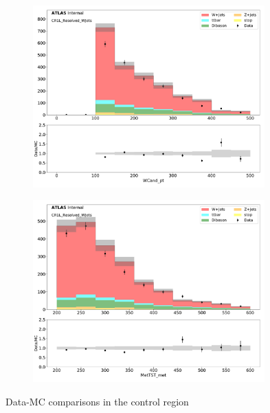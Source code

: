 \begin{figure}[htbp]
\begin{subfigure}{0.49\textwidth}
     \includegraphics[width = 0.98\textwidth]{Figures/4/datamc/CR1L_Resolved_WJets/WCand_pt.pdf}
     \caption{\Wcandpt}
     \end{subfigure}
     \begin{subfigure}{0.49\textwidth}
     \includegraphics[width = 0.98\textwidth]{Figures/4/datamc/CR1L_Resolved_WJets/MetTST_met.pdf}
     \caption{\met}
     \end{subfigure}

     \caption{Data-MC comparisons in the \resolved \wjets control region}
     \label{fig:Data_MC_CRdR_resolved}
  \end{figure}
